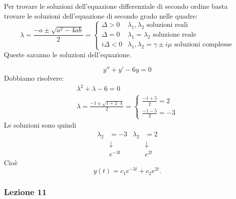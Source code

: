 Per trovare le soluzioni dell'equazione differenziale di secondo ordine basta trovare le soluzioni dell'equazione di secondo grado nelle quadre:
\begin{equation}
    \lambda = \frac{-a \pm \sqrt{a^2 - 4ab}}{2} = \begin{cases}
        \Delta > 0 & \lambda_1, \lambda_2 \text{ soluzioni reali} \\
        \Delta = 0 & \lambda_1 = \lambda_2 \text{ soluzione reale} \\
        i\Delta < 0 & \lambda_1, \lambda_2 = \gamma \pm i\mu \text{ soluzioni complesse}
    \end{cases}
\end{equation}
Queste saranno le soluzioni dell'equazione.

\begin{esempio}
    \begin{equation}
        y''+y' - 6y = 0
    \end{equation}
    Dobbiamo risolvere:
    \begin{gather*}
        \lambda^2 + \lambda - 6 = 0 \\
        \lambda = \frac{-1 \pm \sqrt{1+2 \cdot 4}}{2} = \begin{cases}
            \frac{-1 + 5}{2} = 2 \\
            \frac{-1 - 5}{2} = -3
        \end{cases}
    \end{gather*}
    Le soluzioni sono quindi
    \begin{align*}
        \lambda_2 &= -3 & \lambda_2 &= 2 \\
           &\downarrow    &    &\downarrow \\
           &e^{-3t} &    &e^{2t}
    \end{align*}
    Cioè
    \begin{equation}
        y(t)=c_1e^{-3t}+c_2e^{2t}.
    \end{equation}
\end{esempio}

\subsubsection{Lezione 11}
